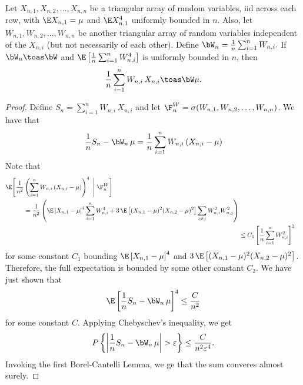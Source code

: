 \begin{proposition}\label{P:weighted-slln}
    Let $X_{n,1}, X_{n,2}, \ldots, X_{n,n}$ be a triangular array of random
    variables, iid across each row, with $\E X_{n,1} = \mu$ and 
    $\E X_{n,1}^4$  uniformly bounded in $n$.
    Also, let $W_{n,1}, W_{n,2}, \ldots, 
    W_{n,n}$ be another triangular array of random variables independent of 
    the $X_{n,i}$ (but not necessarily of each other).  Define 
    \(
        \bW_n = \frac{1}{n} \sum_{i=1}^n W_{n,i}.
    \) 
    If $\bW_n \toas \bW$ and 
    $\E \left[ \frac{1}{n} \sum_{i=1}^n W_{n,i}^4 \right]$ is uniformly 
    bounded in $n$, then
    \[
        \frac{1}{n} \sum_{i=1}^n W_{n,i} \, X_{n,i} \toas \bW \mu.
    \]
\end{proposition}
\begin{proof}
    Define $S_n = \sum_{i=1}^n W_{n,i} \, X_{n,i}$ and let
    $\F^W_n = \sigma( W_{n,1}, W_{n,2}, \ldots, W_{n,n})$.  We have that
    \[
        \frac{1}{n} S_n - \bW_n \, \mu
        = 
       \frac{1}{n}
       \sum_{i=1}^n
           W_{n,i} \,
           (X_{n,i} - \mu) 
    \]
    Note that
    \begin{align*}
        \begin{split}
        \E \Bigg[
            \frac{1}{n^2}
            &\left(
                \sum_{i=1}^n
                    W_{n,i} \,
                    (X_{n,i} - \mu) 
            \right)^4
        \,\, \Bigg| \,\,
            \F^W_n
        \Bigg] \\
        &= \frac{1}{n^2} \left(
               \E \left[ X_{n,1} - \mu \right]^4
               \sum_{i=1}^n
                   W_{n,i}^4
               +
               3 \, \E \left[
                   (X_{n,1} - \mu)^2 (X_{n,2} - \mu)^2
               \right]
               \sum_{i \neq j}
                   W_{n,i}^2 W_{n,j}^2
           \right)
        \end{split} \\
        &\leq C_1 \left[
            \frac{1}{n}
            \sum_{i=1}^n W_{n,i}^2
        \right]^2
    \end{align*}
    for some constant $C_1$ bounding $\E \left[ X_{n,1} - \mu \right]^4$
    and $3 \, \E \left[ (X_{n,1} - \mu)^2 (X_{n,2} - \mu)^2 \right]$.
    Therefore, the full expectation is bounded by some other constant $C_2$.  
    We have just shown that
    \[
        \E \left[ 
            \frac{1}{n} S_n - \bW_n \, \mu
           \right]^4
        \leq \frac{C}{n^2}
    \]
    for some constant $C$.  Applying Chebyschev's inequality, we get
    \[
        P \left\{
            \left|
                \frac{1}{n} S_n - \bW_n \, \mu
            \right|
            > \varepsilon
        \right\}
        \leq \frac{C}{n^2 \varepsilon^4}.
    \]
    Invoking the first Borel-Cantelli Lemma, we ge that the sum converes
    almost surely.
\end{proof}

